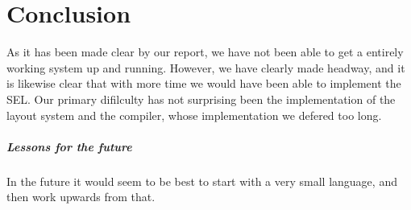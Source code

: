 \chapter*{Conclusion}

As it has been made clear by our report, we have not been able to get
a entirely working system up and running. However, we have clearly
made headway, and it is likewise clear that with more time we would
have been able to implement the SEL. Our primary difilculty has not
surprising been the implementation of the layout system and the
compiler, whose implementation we defered too long.

\paragraph{Lessons for the future}
In the future it would seem to be best to start with a very small
language, and then work upwards from that.

